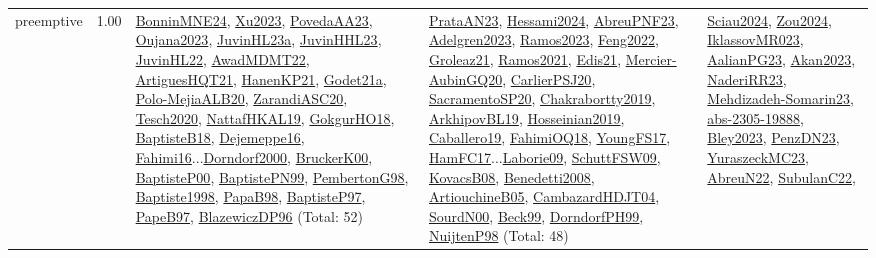 {\begin{longtable}{p{3cm}r>{\raggedright\arraybackslash}p{6cm}>{\raggedright\arraybackslash}p{6cm}>{\raggedright\arraybackslash}p{8cm}}
\index{preemptive}\index{Concepts!preemptive}preemptive &  1.00 & \hyperref[detail:BonninMNE24]{BonninMNE24}, \hyperref[detail:Xu2023]{Xu2023}, \hyperref[detail:PovedaAA23]{PovedaAA23}, \hyperref[detail:Oujana2023]{Oujana2023}, \hyperref[detail:JuvinHL23a]{JuvinHL23a}, \hyperref[detail:JuvinHHL23]{JuvinHHL23}, \hyperref[detail:JuvinHL22]{JuvinHL22}, \hyperref[detail:AwadMDMT22]{AwadMDMT22}, \hyperref[detail:ArtiguesHQT21]{ArtiguesHQT21}, \hyperref[detail:HanenKP21]{HanenKP21}, \hyperref[detail:Godet21a]{Godet21a}, \hyperref[detail:Polo-MejiaALB20]{Polo-MejiaALB20}, \hyperref[detail:ZarandiASC20]{ZarandiASC20}, \hyperref[detail:Tesch2020]{Tesch2020}, \hyperref[detail:NattafHKAL19]{NattafHKAL19}, \hyperref[detail:GokgurHO18]{GokgurHO18}, \hyperref[detail:BaptisteB18]{BaptisteB18}, \hyperref[detail:Dejemeppe16]{Dejemeppe16}, \hyperref[detail:Fahimi16]{Fahimi16}...\hyperref[detail:Dorndorf2000]{Dorndorf2000}, \hyperref[detail:BruckerK00]{BruckerK00}, \hyperref[detail:BaptisteP00]{BaptisteP00}, \hyperref[detail:BaptistePN99]{BaptistePN99}, \hyperref[detail:PembertonG98]{PembertonG98}, \hyperref[detail:Baptiste1998]{Baptiste1998}, \hyperref[detail:PapaB98]{PapaB98}, \hyperref[detail:BaptisteP97]{BaptisteP97}, \hyperref[detail:PapeB97]{PapeB97}, \hyperref[detail:BlazewiczDP96]{BlazewiczDP96} (Total: 52) & \hyperref[detail:PrataAN23]{PrataAN23}, \hyperref[detail:Hessami2024]{Hessami2024}, \hyperref[detail:AbreuPNF23]{AbreuPNF23}, \hyperref[detail:Adelgren2023]{Adelgren2023}, \hyperref[detail:Ramos2023]{Ramos2023}, \hyperref[detail:Feng2022]{Feng2022}, \hyperref[detail:Groleaz21]{Groleaz21}, \hyperref[detail:Ramos2021]{Ramos2021}, \hyperref[detail:Edis21]{Edis21}, \hyperref[detail:Mercier-AubinGQ20]{Mercier-AubinGQ20}, \hyperref[detail:CarlierPSJ20]{CarlierPSJ20}, \hyperref[detail:SacramentoSP20]{SacramentoSP20}, \hyperref[detail:Chakrabortty2019]{Chakrabortty2019}, \hyperref[detail:ArkhipovBL19]{ArkhipovBL19}, \hyperref[detail:Hosseinian2019]{Hosseinian2019}, \hyperref[detail:Caballero19]{Caballero19}, \hyperref[detail:FahimiOQ18]{FahimiOQ18}, \hyperref[detail:YoungFS17]{YoungFS17}, \hyperref[detail:HamFC17]{HamFC17}...\hyperref[detail:Laborie09]{Laborie09}, \hyperref[detail:SchuttFSW09]{SchuttFSW09}, \hyperref[detail:KovacsB08]{KovacsB08}, \hyperref[detail:Benedetti2008]{Benedetti2008}, \hyperref[detail:ArtiouchineB05]{ArtiouchineB05}, \hyperref[detail:CambazardHDJT04]{CambazardHDJT04}, \hyperref[detail:SourdN00]{SourdN00}, \hyperref[detail:Beck99]{Beck99}, \hyperref[detail:DorndorfPH99]{DorndorfPH99}, \hyperref[detail:NuijtenP98]{NuijtenP98} (Total: 48) & \hyperref[detail:Sciau2024]{Sciau2024}, \hyperref[detail:Zou2024]{Zou2024}, \hyperref[detail:IklassovMR023]{IklassovMR023}, \hyperref[detail:AalianPG23]{AalianPG23}, \hyperref[detail:Akan2023]{Akan2023}, \hyperref[detail:NaderiRR23]{NaderiRR23}, \hyperref[detail:Mehdizadeh-Somarin23]{Mehdizadeh-Somarin23}, \hyperref[detail:abs-2305-19888]{abs-2305-19888}, \hyperref[detail:Bley2023]{Bley2023}, \hyperref[detail:PenzDN23]{PenzDN23}, \hyperref[detail:YuraszeckMC23]{YuraszeckMC23}, \hyperref[detail:AbreuN22]{AbreuN22}, \hyperref[detail:SubulanC22]{SubulanC22}, 
\end{longtable}}
